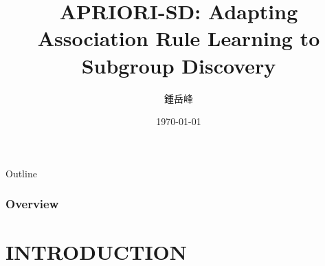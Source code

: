 \documentclass{beamer}
\begin{document}
\begin{CJK*}{UTF8}{bsmi}


\title[APRIORI-SD]{APRIORI-SD: Adapting Association Rule Learning to Subgroup Discovery} %

\author{鍾岳峰} %
\date{\today} %



\begin{frame}
\titlepage %
\end{frame}



\begin{frame}{Outline}
\frametitle{Overview} %

\tableofcontents[hideallsubsections] %
\end{frame}


\section{INTRODUCTION} %



\end{CJK*}
\end{document}
